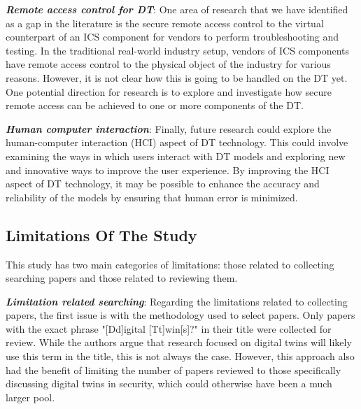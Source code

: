 \textbf{\textit{Remote access control for DT}}: One area of research that we have identified as a gap in the literature is the secure remote access control to the virtual counterpart of an ICS component for vendors to perform troubleshooting and testing. In the traditional real-world industry setup, vendors of ICS components have remote access control to the physical object of the industry for various reasons. However, it is not clear how this is going to be handled on the DT yet. One potential direction for research is to explore and investigate how secure remote access can be achieved to one or more components of the DT.

\textbf{\textit{Human computer interaction}}: Finally, future research could explore the human-computer interaction (HCI) aspect of DT technology. This could involve examining the ways in which users interact with DT models and exploring new and innovative ways to improve the user experience. By improving the HCI aspect of DT technology, it may be possible to enhance the accuracy and reliability of the models by ensuring that human error is minimized.

\subsection{Limitations Of The Study}
% 
This study has two main categories of limitations: those related to collecting searching papers and those related to reviewing them.

\textbf{\textit{Limitation related searching}}: Regarding the limitations related to collecting papers, the first issue is with the methodology used to select papers. Only papers with the exact phrase "[Dd]igital [Tt]win[s]?" in their title were collected for review. While the authors argue that research focused on digital twins will likely use this term in the title, this is not always the case. However, this approach also had the benefit of limiting the number of papers reviewed to those specifically discussing digital twins in security, which could otherwise have been a much larger pool. 


